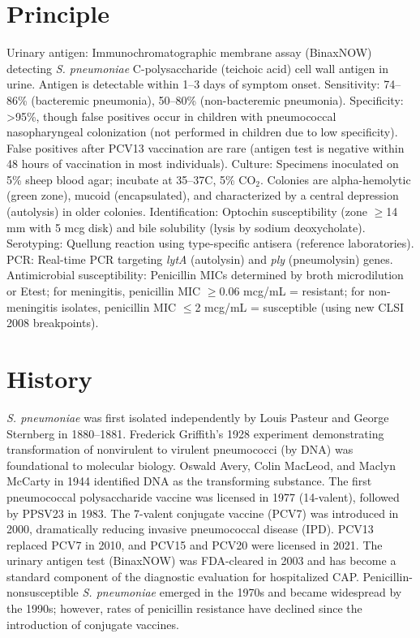 \section*{Principle}
Urinary antigen: Immunochromatographic membrane assay (BinaxNOW) detecting \textit{S. pneumoniae} C-polysaccharide (teichoic acid) cell wall antigen in urine. Antigen is detectable within 1--3 days of symptom onset. Sensitivity: 74--86\% (bacteremic pneumonia), 50--80\% (non-bacteremic pneumonia). Specificity: >95\%, though false positives occur in children with pneumococcal nasopharyngeal colonization (not performed in children due to low specificity). False positives after PCV13 vaccination are rare (antigen test is negative within 48 hours of vaccination in most individuals). Culture: Specimens inoculated on 5\% sheep blood agar; incubate at 35--37\textdegree{}C, 5\% CO$_2$. Colonies are alpha-hemolytic (green zone), mucoid (encapsulated), and characterized by a central depression (autolysis) in older colonies. Identification: Optochin susceptibility (zone $\geq$14 mm with 5 mcg disk) and bile solubility (lysis by sodium deoxycholate). Serotyping: Quellung reaction using type-specific antisera (reference laboratories). PCR: Real-time PCR targeting \textit{lytA} (autolysin) and \textit{ply} (pneumolysin) genes. Antimicrobial susceptibility: Penicillin MICs determined by broth microdilution or Etest; for meningitis, penicillin MIC $\geq$0.06 mcg/mL = resistant; for non-meningitis isolates, penicillin MIC $\leq$2 mcg/mL = susceptible (using new CLSI 2008 breakpoints).

\section*{History}
\textit{S. pneumoniae} was first isolated independently by Louis Pasteur and George Sternberg in 1880--1881. Frederick Griffith's 1928 experiment demonstrating transformation of nonvirulent to virulent pneumococci (by DNA) was foundational to molecular biology. Oswald Avery, Colin MacLeod, and Maclyn McCarty in 1944 identified DNA as the transforming substance. The first pneumococcal polysaccharide vaccine was licensed in 1977 (14-valent), followed by PPSV23 in 1983. The 7-valent conjugate vaccine (PCV7) was introduced in 2000, dramatically reducing invasive pneumococcal disease (IPD). PCV13 replaced PCV7 in 2010, and PCV15 and PCV20 were licensed in 2021. The urinary antigen test (BinaxNOW) was FDA-cleared in 2003 and has become a standard component of the diagnostic evaluation for hospitalized CAP. Penicillin-nonsusceptible \textit{S. pneumoniae} emerged in the 1970s and became widespread by the 1990s; however, rates of penicillin resistance have declined since the introduction of conjugate vaccines.

